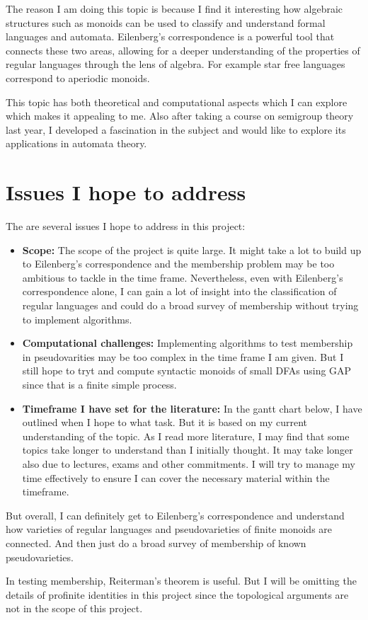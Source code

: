 The reason I am doing this topic is because I find it interesting how algebraic structures such as monoids can be used to classify and understand formal languages and automata. 
Eilenberg's correspondence is a powerful tool that connects these two areas, allowing for a deeper understanding of the properties of regular languages through the lens of algebra.
For example star free languages correspond to aperiodic monoids.

This topic has both theoretical and computational aspects which I can explore which makes it appealing to me. Also after taking
a course on semigroup theory last year, I developed a fascination in the subject and would like to explore its applications in automata theory.

\section*{Issues I hope to address}
The are several issues I hope to address in this project:
\begin{itemize}
    \item {\bf Scope:} The scope of the project is quite large. It might take a lot to build up to Eilenberg's correspondence and the membership problem may be too ambitious to tackle in the time frame. 
    Nevertheless, even with Eilenberg's correspondence alone, I can gain a lot of insight into the classification of regular languages and could do a broad survey of membership without trying to implement algorithms.
    \item {\bf Computational challenges:} Implementing algorithms to test membership in pseudovarities may be too complex in the time frame I am given. But I still hope to tryt and compute syntactic monoids of small DFAs using GAP since that is a finite simple process.
    \item {\bf Timeframe I have set for the literature:} In the gantt chart below, I have outlined when I hope to what task. But it is based on my current understanding of the topic. As I read more literature, I may find that some topics take longer to understand than I initially thought.
    It may take longer also due to lectures, exams and other commitments. I will try to manage my time effectively to ensure I can cover the necessary material within the timeframe. 
 \end{itemize}

 But overall, I can definitely get to Eilenberg's correspondence and understand how varieties of regular languages and pseudovarieties of finite monoids are connected. And then just do a broad survey of membership of known pseudovarieties.

 In testing membership, Reiterman's theorem is useful. But I will be omitting the details of profinite identities in this project since the topological arguments are not in the scope of this project.